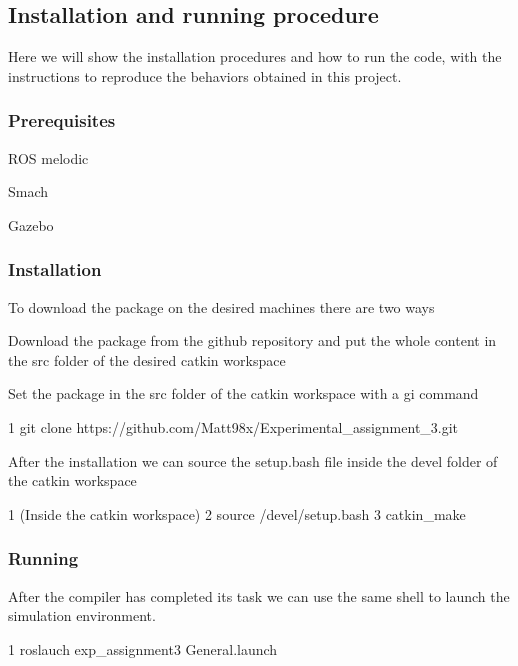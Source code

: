 \subsection*{Installation and running procedure}

Here we will show the installation procedures and how to run the code, with the instructions to reproduce the behaviors obtained in this project.

\subsubsection*{Prerequisites}


\begin{DoxyItemize}
\item R\+OS melodic
\item Smach
\item Gazebo
\end{DoxyItemize}

\subsubsection*{Installation}

To download the package on the desired machines there are two ways
\begin{DoxyItemize}
\item Download the package from the github repository and put the whole content in the src folder of the desired catkin workspace
\item Set the package in the src folder of the catkin workspace with a gi command 
\begin{DoxyCode}
1 git clone https://github.com/Matt98x/Experimental\_assignment\_3.git
\end{DoxyCode}
 After the installation we can source the setup.\+bash file inside the devel folder of the catkin workspace 
\begin{DoxyCode}
1 (Inside the catkin workspace)
2  source /devel/setup.bash
3 catkin\_make
\end{DoxyCode}

\end{DoxyItemize}

\subsubsection*{Running}


\begin{DoxyItemize}
\item After the compiler has completed its task we can use the same shell to launch the simulation environment. 
\begin{DoxyCode}
1 roslauch exp\_assignment3 General.launch
\end{DoxyCode}

\end{DoxyItemize}

